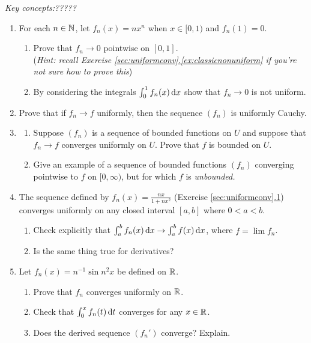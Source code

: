 \begin{exercises}
	\emph{Key concepts:\quad ?????}

	\begin{enumerate}
		\item For each $n\in\mathbb{N}$, let $f_n(x)=nx^n$ when $x\in[0,1)$ and $f_n(1)=0$.
		\begin{enumerate}
	    \item Prove that $f_n\to 0$ pointwise on $[0,1]$.\\
	    (\emph{Hint: recall Exercise \hyperref[ex:classicnonuniform]{\ref*{sec:uniformconv}.\ref*{ex:classicnonuniform}} if you're not sure how to prove this})
	    \item By considering the integrals $\int_0^1f_n(x)\,{\mathrm{d} x}$ show that $f_n\to 0$ is not uniform.
	  \end{enumerate}
	  
	  \item\label{ex:cauchyexproof} Prove that if $f_n\to f$ uniformly, then the sequence $(f_n)$ is uniformly Cauchy.
	  
	  \item\begin{enumerate}
	    \item Suppose $(f_n)$ is a sequence of bounded functions on $U$ and suppose that $f_n\to f$ converges uniformly on $U$. Prove that $f$ is bounded on $U$.
	    \item Give an example of a sequence of bounded functions $(f_n)$ converging pointwise to $f$ on $[0,\infty)$, but for which $f$ is \emph{unbounded.}
	  \end{enumerate}
	  
	  \item The sequence defined by $f_n(x)=\frac{nx}{1+nx^2}$ (Exercise \hyperref[exs:uniform1]{\ref*{sec:uniformconv}.1}) converges uniformly on any closed interval $[a,b]$ where $0<a<b$.
	  \begin{enumerate}
	    \item Check explicitly that $\int_a^b f_n(x)\,{\mathrm{d} x}\to \int_a^bf(x)\,{\mathrm{d} x}$, where $f=\lim f_n$.
	    \item Is the same thing true for derivatives?
	  \end{enumerate}
	  
	 	\item Let $f_n(x)=n^{-1}\sin n^2x$ be defined on $\mathbb{R}$.
	 	\begin{enumerate}
	 	  \item Prove that $f_n$ converges uniformly on $\mathbb{R}$.
	 	  \item Check that $\int_0^x f_n(t)\,{\mathrm{d} t}$ converges for any $x\in\mathbb{R}$.
	 	  \item Does the derived sequence $(f_n')$ converge? Explain.
	 	\end{enumerate}
	  

\end{enumerate}
\end{exercises}
